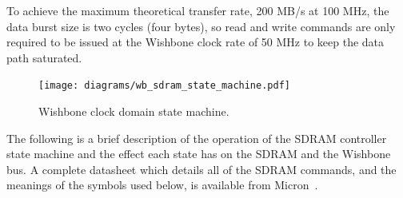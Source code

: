 To achieve the maximum theoretical transfer rate, 200 MB/s at 100 MHz, the data
burst size is two cycles (four bytes), so read and write commands are only
required to be issued at the Wishbone clock rate of 50 MHz to keep the data path
saturated.

\begin{figure}[h!]
\begin{center}
\texttt{[image: diagrams/wb\_sdram\_state\_machine.pdf]}
\caption[Wishbone Clock Domain State Machine]{Wishbone clock domain state
machine.}
\end{center}
\label{MEM_SDRAM_SM}
\end{figure}

The following is a brief description of the operation of the SDRAM controller
state machine and the effect each state has on the SDRAM and the Wishbone bus. A
complete datasheet which details all of the SDRAM commands, and the meanings of
the symbols used below, is available from Micron~\cite{Micron_SDRAM_DS}.

